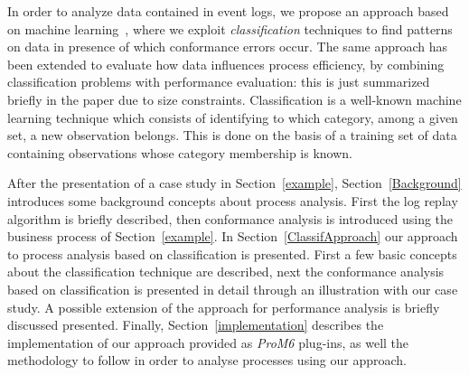 \documentclass{llncs}
\begin{document}
In order to analyze data contained in event logs, we propose an approach based on {machine learning}~\cite{tan2005introduction}, where we exploit \emph{classification} techniques to find patterns on data in presence of which conformance errors occur. The same approach has been extended to evaluate how data influences  process efficiency, by combining classification problems with performance evaluation: this is just summarized briefly in the paper due to size constraints.  Classification is a well-known {machine learning} technique which consists of identifying to which category, among a given set, a new observation belongs. This is done on the basis of a training set of data containing observations whose category membership is known.

After the presentation of a case study in Section~\ref{example}, Section~\ref{Background} introduces some background concepts about process analysis. First the log replay algorithm is briefly described, then conformance  analysis is introduced using the business process of Section~\ref{example}. In Section~\ref{ClassifApproach} our approach to process analysis based on classification is presented. First a few basic concepts about the classification technique are described, next the conformance analysis based on classification is presented in detail through an illustration with our case study.  A possible extension of the approach for performance analysis is briefly discussed presented. Finally, Section~\ref{implementation} describes the implementation of our approach provided as \emph{ProM6}\cite{DBLP:conf/bpm/AalstDGRVW09} plug-ins, as well the methodology to follow in order to analyse processes using our approach.
\end{document}
